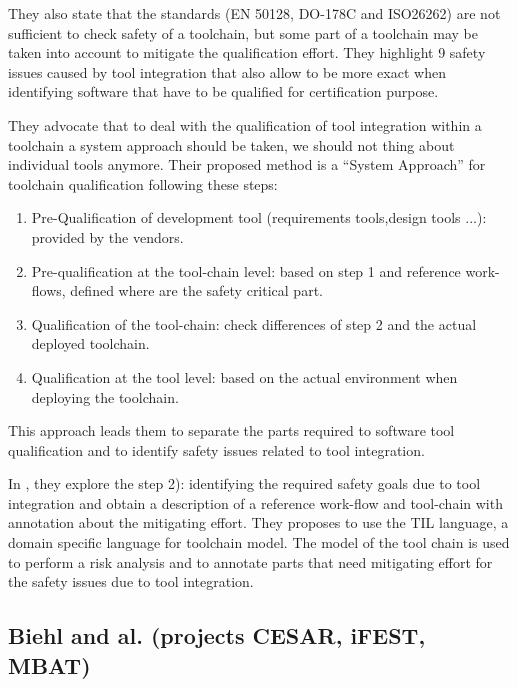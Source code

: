 They also state that the standards (EN 50128, DO-178C and ISO26262)
are not sufficient to check safety of a toolchain, but some part of a
toolchain may be taken into account to mitigate the qualification
effort. 
They highlight 9 safety issues caused by tool integration that also
allow to be more exact when identifying software that have to be
qualified for certification purpose. 

They advocate that to deal with the qualification of tool integration
within a toolchain a system approach should be taken, we should not
thing about individual tools anymore.  Their proposed method is a ``System
Approach'' for toolchain qualification following these steps:

\begin{enumerate}
\item Pre-Qualification of development tool (requirements tools,design
  tools ...): provided by the vendors.
\item Pre-qualification at the tool-chain level: based on step 1 and
  reference work-flows, defined where are the safety critical part.
\item Qualification of the tool-chain: check differences of step 2 and
  the actual deployed toolchain.
\item Qualification at the tool level: based on the actual environment
  when deploying the toolchain.
\end{enumerate}
This approach leads them to separate the parts required to software tool
qualification and to identify safety issues related to tool integration.

In \cite{asplund_towards_2012}, they explore the step 2): identifying
the required safety goals due to tool integration and obtain a
description of a reference work-flow and tool-chain with annotation
about the mitigating effort.  They proposes to use the TIL language, a
domain specific language for toolchain model.  The model of the tool
chain is used to perform a risk analysis and to annotate parts
that need mitigating effort for the safety issues due to tool
integration. 

\subsection{Biehl and al. (projects CESAR, iFEST, MBAT)}
\label{sec-1-2.3}

